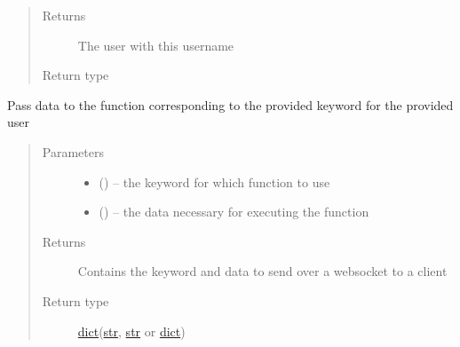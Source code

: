 \documentclass[letterpaper,10pt,english]{sphinxmanual}
\begin{document}
\begin{fulllineitems}
\begin{fulllineitems}
\begin{quote}
\begin{description}
\item[{Returns}] \leavevmode
The user with this username

\item[{Return type}] \leavevmode
{\hyperref[\detokenize{user:user.User}]{}}

\end{description}\end{quote}

\end{fulllineitems}


\begin{fulllineitems}
\label{\detokenize{consumer:consumer.Consumer.consumer}}
Pass data to the function corresponding to the provided keyword for the provided user
\begin{quote}\begin{description}
\item[{Parameters}] \leavevmode\begin{itemize}
\item {} 
 (\href{https://docs.python.org/2/library/functions.html\#str}{}) -- the keyword for which function to use

\item {} 
 (\href{https://docs.python.org/2/library/stdtypes.html\#dict}{}\sphinxstyleliteralemphasis{(}\href{https://docs.python.org/2/library/functions.html\#str}{}\sphinxstyleliteralemphasis{, }\href{https://docs.python.org/2/library/functions.html\#str}{}\href{https://docs.python.org/2/library/stdtypes.html\#dict}{}\sphinxstyleliteralemphasis{)}\sphinxstyleliteralemphasis{}) -- the data necessary for executing the function

\end{itemize}

\item[{Returns}] \leavevmode
Contains the keyword and data to send over a websocket to a client

\item[{Return type}] \leavevmode
\href{https://docs.python.org/2/library/stdtypes.html\#dict}{dict}(\href{https://docs.python.org/2/library/functions.html\#str}{str}, \href{https://docs.python.org/2/library/functions.html\#str}{str} or \href{https://docs.python.org/2/library/stdtypes.html\#dict}{dict})

\end{description}\end{quote}

\end{fulllineitems}


\end{fulllineitems}
\end{document}
